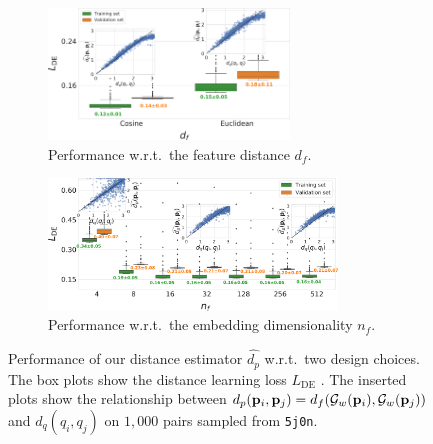\begin{figure}[ht]
    \centering
    \begin{subfigure}[t]{0.44\linewidth}
        \centering
        \includegraphics[height=3.5cm]{figures/dPdQ_feat_distances.pdf}
        \caption{%
            Performance w.r.t.\ the feature distance $d_f$.
        }\label{fig:geo-eucl-mlp}
    \end{subfigure}
    \hfill
    \begin{subfigure}[t]{0.51\linewidth}
        \centering
        \includegraphics[height=3.5cm]{figures/de_nf.pdf}
        \caption{%
            Performance w.r.t.\ the embedding dimensionality $n_f$.
        }\label{fig:4d-vs-256d-de}
    \end{subfigure}
        \caption{%
            Performance of our distance estimator $\widehat{d_p}$ w.r.t.\ two design choices.
            The box plots show the distance learning loss $L_\text{DE}$ .
            The inserted plots show the relationship between $d_p(\mathbf{p}_i, \mathbf{p}_j) = d_f(\mathcal{G}_w(\mathbf{p}_i), \mathcal{G}_w(\mathbf{p}_j))$ and $d_q(q_i, q_j)$ on $1,000$ pairs sampled from \texttt{5j0n}.
        }
\end{figure}

